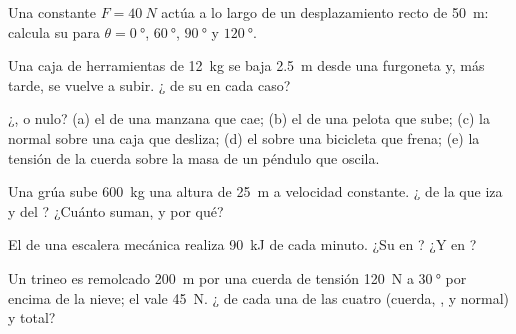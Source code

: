 \begin{exercise}[$\star$]\label{exo:g11:work-of-force:1}
Una  constante $F = \qty{40}{N}$ actúa a lo largo de un
desplazamiento recto de \qty{50}{m}: calcula su  para
$\theta = \qty{0}{\degree}$, $\qty{60}{\degree}$, $\qty{90}{\degree}$ y
$\qty{120}{\degree}$.
\end{exercise}

\begin{exercise}[$\star$]\label{exo:g11:work-of-force:2}
Una caja de herramientas de \qty{12}{kg} se baja \qty{2.5}{m} desde una
furgoneta y, más tarde, se vuelve a subir. ¿ de su  en cada
caso?
\end{exercise}

\begin{exercise}[$\star$]\label{exo:g11:work-of-force:3}
¿,  o nulo? (a) el  de una manzana que cae; (b) el
 de una pelota que sube; (c) la  normal sobre una caja que
desliza; (d) el  sobre una bicicleta que frena; (e) la tensión
de la cuerda sobre la masa de un péndulo que oscila.
\end{exercise}

\begin{exercise}[$\star$]\label{exo:g11:work-of-force:4}
Una grúa sube \qty{600}{kg} una altura de \qty{25}{m} a velocidad
constante. ¿ de la  que iza y del ? ¿Cuánto suman, y
por qué?
\end{exercise}

\begin{exercise}[$\star$]\label{exo:g11:work-of-force:5}
El  de una escalera mecánica realiza \qty{90}{kJ} de  cada
minuto. ¿Su  en ? ¿Y en ?
\end{exercise}

\begin{exercise}[$\star\star$]\label{exo:g11:work-of-force:6}
Un trineo es remolcado \qty{200}{m} por una cuerda de tensión
\qty{120}{N} a $\qty{30}{\degree}$ por encima de la nieve; el 
vale \qty{45}{N}. ¿ de cada una de las cuatro  (cuerda,
,  y normal) y total?
\end{exercise}

